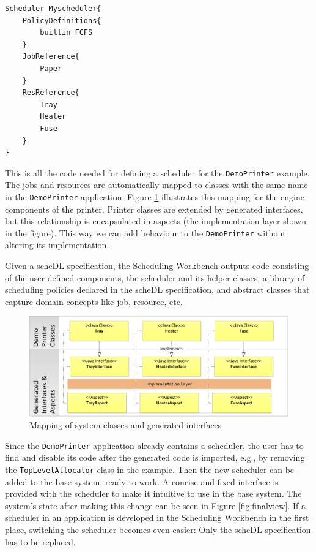 \begin{lstlisting}[caption={Scheduler definition.}, label={lst:scheduler}]
Scheduler Myscheduler{ 
	PolicyDefinitions{ 
		builtin FCFS 
	} 
	JobReference{
		Paper 
	}
	ResReference{ 
		Tray 
		Heater 
		Fuse 
	} 
}
\end{lstlisting}
	This is all the code needed for defining a scheduler for the
	\texttt{DemoPrinter} example. The jobs and resources are automatically mapped to
	classes with the same name in the \texttt{DemoPrinter} application.
	Figure \ref{fig:generated} illustrates this mapping for the engine components of
	the printer. Printer classes are extended by generated interfaces, but this
	relationship is encapsulated in aspects (the implementation layer shown in the
	figure).
	This way we can add behaviour to the \texttt{DemoPrinter} without altering its
	implementation.
	
	Given a \textsf{scheDL} specification, the Scheduling Workbench outputs code consisting
	of the user defined components, the scheduler and its helper classes, a library of scheduling
	policies declared in the \textsf{scheDL} specification, and
	abstract classes that capture domain concepts like job, resource, etc.
	\begin{figure}
	\includegraphics[width=\textwidth]{chapteroce/images/generated.png}
	\caption{Mapping of system classes and generated interfaces}
	\label{fig:generated}
	\end{figure}
	Since the \texttt{DemoPrinter} application already contains a scheduler, the user has to find and disable its code after the generated code is imported, e.g., by removing the
	\texttt{TopLevelAllocator} class in the example. Then the new scheduler can be added to the
	base system, ready to work. A concise and fixed interface is provided with the
	scheduler to make it intuitive to use in the base system. The system's state
	after making this change can be seen in Figure \ref{fig:finalview}.
	If a scheduler in an application is developed in the Scheduling Workbench in the first place, switching the scheduler becomes even easier: Only the \textsf{scheDL} specification has to be replaced.
		

